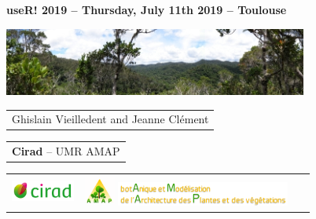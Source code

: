 

{

  \begin{frame}
    \begin{center}
      \small{\textbf{useR! 2019 -- Thursday, July 11th 2019 -- Toulouse}}
    \end{center}
    \vspace{-0.5cm}
    \titlepage %
    \vspace{-2.5cm}
    \begin{center}
      \includegraphics[width=10cm]{figs/Banniere.png}
    \end{center}
    \begin{center}

      {\footnotesize
        \begin{tabular}{c}
          Ghislain Vieilledent and 
          Jeanne Clément
        \end{tabular}
      }

      \vspace{0.25cm}

      {\footnotesize
        \begin{tabular}{c}
          \textbf{Cirad} -- UMR AMAP 
        \end{tabular}
      }

      \vspace{0.25cm}

      \begin{tabular}{C{2cm}C{2cm}C{3cm}}
        \includegraphics[height=0.7cm]{figs/Logo-Cirad.png} &
        \includegraphics[height=1cm, width=1cm]{figs/logo-AMAP.png} 
        \includegraphics[height=0.8cm]{figs/AMAP-titre-long.png} &
        ~
      \end{tabular}

    \end{center}

  \end{frame}
}

